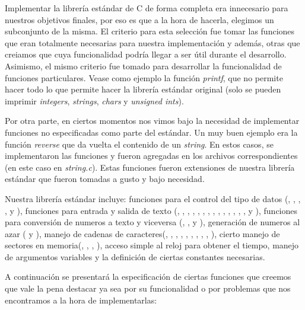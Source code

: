 \documentclass[a4paper,10pt]{article}
\begin{document}
    Implementar la librería estándar de C de forma completa era innecesario para nuestros objetivos finales, por eso es que a la hora de hacerla, elegimos un subconjunto de la misma. El criterio para esta selección fue tomar las funciones que eran totalmente necesarias para nuestra implementación y además, otras que creiamos que cuya funcionalidad podría llegar a ser útil durante el desarrollo.
    Asimismo, el mismo criterio fue tomado para desarrollar la funcionalidad de funciones particulares. Vease como ejemplo la función \textit{printf}, que no permite hacer todo lo que permite hacer la librería estándar original (solo se pueden imprimir \textit{integers}, \textit{strings}, \textit{chars} y \textit{unsigned ints}).

    Por otra parte, en ciertos momentos nos vimos bajo la necesidad de implementar funciones no especificadas como parte del estándar. Un muy buen ejemplo era la función \textit{reverse} que da vuelta el contenido de un \textit{string}. En estos casos, se implementaron las funciones y fueron agregadas en los archivos correspondientes (en este caso en \textit{string.c}). Estas funciones fueron extensiones de nuestra librería estándar que fueron tomadas a gusto y bajo necesidad.

    Nuestra librería estándar incluye: funciones para el control del tipo de datos (, , , ,  y ), funciones para entrada y salida de texto (, , , , , , , , , , , , , ,  y ), funciones para conversión de numeros a texto y viceversa (, ,  y ), generación de numeros al azar ( y ), manejo de cadenas de caracteres(, , , , , , , , , ), cierto manejo de sectores en memoria(, , , ), acceso simple al reloj para obtener el tiempo, manejo de argumentos variables y la definición de ciertas constantes necesarias.

    A continuación se presentará la especificación de ciertas funciones que creemos que vale la pena destacar ya sea por su funcionalidad o por problemas que nos encontramos a la hora de implementarlas:
\end{document}
